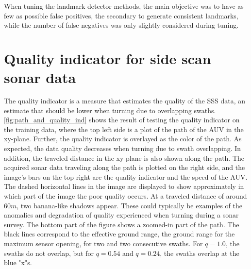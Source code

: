 When tuning the landmark detector methods, the main objective was to have as few as possible false positives, the secondary to generate consistent landmarks, while the number of false negatives was only slightly considered during tuning. 

\section{Quality indicator for side scan sonar data}

The quality indicator is a measure that estimates the quality of the SSS data, an estimate that should be lower when turning due to overlapping swaths. \cref{fig:path_and_quality_ind} shows the result of testing the quality indicator on the training data, where the top left side is a plot of the path of the AUV in the xy-plane. Further, the quality indicator is overlayed as the color of the path. As expected, the data quality decreases when turning due to swath overlapping. In addition, the traveled distance in the xy-plane is also shown along the path. The acquired sonar data traveling along the path is plotted on the right side, and the image's bars on the top right are the quality indicator and the speed of the AUV. The dashed horizontal lines in the image are displayed to show approximately in which part of the image the poor quality occurs. At a traveled distance of around $60 m$, two banana-like shadows appear. These could typically be examples of the anomalies and degradation of quality experienced when turning during a sonar survey. The bottom part of the figure shows a zoomed-in part of the path. The black lines correspond to the effective ground range, the ground range for the maximum sensor opening, for two and two consecutive swaths. For $q = 1.0$, the swaths do not overlap, but for $q = 0.54$ and $q=0.24$, the swaths overlap at the blue "x"s. 

